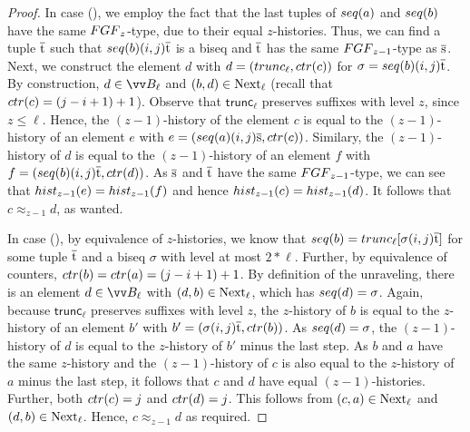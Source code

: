 \begin{proof}
  In case (), we employ the fact that the last tuples of $\seq{a}$ and $\seq{b}$ have the same $\FGF_{z}$-type, due to their equal $z$-histories.
  Thus, we can find a tuple $\overline{\mathrm{t}}$ such that $\seq{b} (i,j) \elemtuplet$ is a biseq and $\overline{\mathrm{t}}$ has the same $\FGF_{z{-}1}$-type as $\overline{\mathrm{s}}$.
  Next, we construct the element $d$ with $d = (\mathsf{trunc}_{\ell}, \ctr{c})$ for $\sigma = \seq{b}(i,j)\elemtuplet$.
  By construction, $d \in \unraveldom{B}_{\ell}$ and $(b,d) \in \mathrm{Next}_{\ell}$ (recall that $\ctr{c} = (j-i+1)+1$).
  Observe that $\mathsf{trunc}_{\ell}$ preserves suffixes with level $z$, since $z \le \ell$.
  Hence, the $(z{-}1)$-history of the element $c$ is equal to the $(z{-}1)$-history of an element $e$ with $e = (\seq{a}(i,j)\elemtuples, \ctr{c})$.
  Similary, the $(z{-}1)$-history of $d$ is equal to the $(z{-}1)$-history of an element $f$ with $f = (\seq{b}(i,j)\elemtuplet, \ctr{d})$.
  As $\overline{\mathrm{s}}$ and $\overline{\mathrm{t}}$ have the same $\FGF_{z{-}1}$-type, we can see that $\hist{z-1}{e} = \hist{z-1}{f}$ and hence $\hist{z-1}{c} = \hist{z-1}{d}$.
  It follows that $c \approx_{z-1} d$, as wanted.

  In case (), by equivalence of $z$-histories, we know that $\seq{b} = \mathsf{trunc}_{\ell}[\sigma(i,j)\elemtuplet]$ for some tuple $\overline{\mathrm{t}}$ and a biseq $\sigma$ with level at most $2 * \ell$.
  Further, by equivalence of counters, $\ctr{b} = \ctr{a} = (j-i+1) + 1$.
  By definition of the unraveling, there is an element $d \in \unraveldom{B}_{\ell}$ with $(d,b) \in \mathrm{Next}_{\ell}$, which has $\seq{d} = \sigma$.
  Again, because $\mathsf{trunc}_{\ell}$ preserves suffixes with level $z$, the $z$-history of $b$ is equal to the $z$-history of an element $b'$ with $b' = (\sigma(i,j)\elemtuplet, \ctr{b})$.
  As $\seq{d} = \sigma$, the $(z{-}1)$-history of $d$ is equal to the $z$-history of $b'$ minus the last step.
  As $b$ and $a$ have the same $z$-history and the $(z{-}1)$-history of $c$ is also equal to the $z$-history of $a$ minus the last step, it follows that $c$ and $d$ have equal $(z{-}1)$-histories.
  Further, both $\ctr{c} = j$ and $\ctr{d} = j$.
  This follows from $(c,a) \in \mathrm{Next}_{\ell}$ and $(d,b) \in \mathrm{Next}_{\ell}$.
  Hence, $c \approx_{z-1} d$ as required.
\end{proof}

